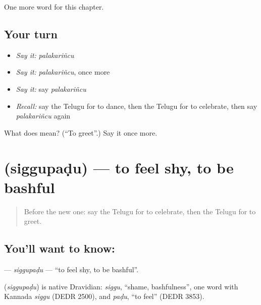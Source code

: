 \begin{grammarlens}[title={What you've built}]
One more word for this chapter.
\end{grammarlens}

\subsection*{Your turn}
\begin{itemize}
\raggedright
  \item \emph{Say it:} \emph{palakariñcu}
  \item \emph{Say it:} \emph{palakariñcu}, once more
  \item \emph{Say it:} say \emph{palakariñcu}
  \item \emph{Recall:} say the Telugu for to dance, then the Telugu for to celebrate, then say \emph{palakariñcu} again
\end{itemize}

\begin{tcolorbox}[breakable,colback=teal!4,colframe=teal!35!black,title={Before you move on}]
What does  mean? (\textquotedblleft{}To greet\textquotedblright{}.) Say it once more.
\end{tcolorbox}
\section[\texorpdfstring{\te{సిగ్గుపడు} (siggupaḍu)}{సిగ్గుపడు (siggupaḍu)}]{ (siggupaḍu) — to feel shy, to be bashful}

\label{lesson:TE-C161-siggupadu}



\begin{quote}
Before the new one: say the Telugu for to celebrate, then the Telugu for to greet.
\end{quote}

\subsection*{You'll want to know: }
\textbf{} — \emph{siggupaḍu} — \textquotedblleft{}to feel shy, to be bashful\textquotedblright{}.

\begin{cousinweb}
\textbf{} (\emph{siggupaḍu}) is native Dravidian: \emph{siggu}, \textquotedblleft{}shame, bashfulness\textquotedblright{}, one word with Kannada \emph{siggu} (DEDR 2500), and \emph{paḍu}, \textquotedblleft{}to feel\textquotedblright{} (DEDR 3853).
\end{cousinweb}

